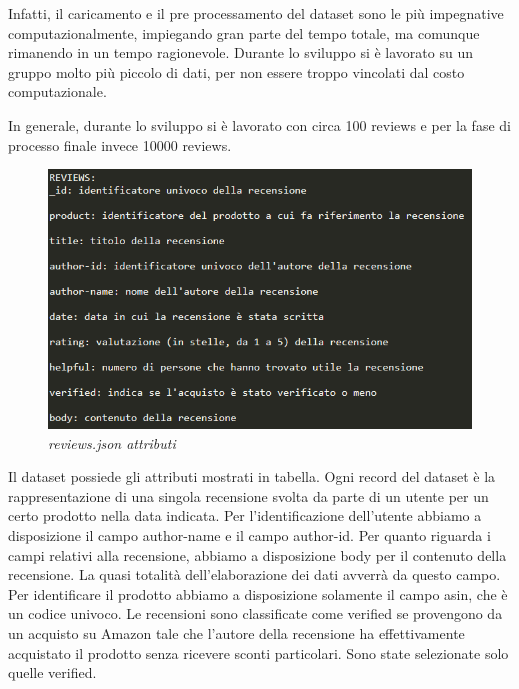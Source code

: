 \documentclass[a4paper,12pt]{article}
\begin{document}
\noindent Infatti, il caricamento e il pre processamento del dataset sono le più impegnative
computazionalmente, impiegando gran parte del tempo totale, ma comunque rimanendo in un tempo ragionevole.
Durante lo sviluppo si è lavorato su un gruppo molto più piccolo di dati, per non essere troppo vincolati dal costo computazionale.

\noindent In generale, durante lo sviluppo si è lavorato con circa 100 reviews e per la fase di processo finale invece 10000 reviews.

\begin{figure}[H]
\centering
\includegraphics[width=0.9\linewidth]{img/reviewsAttributi.png}
\caption{\textit{reviews.json attributi}}
\end{figure}

\noindent Il dataset possiede gli attributi mostrati in tabella. Ogni record del dataset
è la rappresentazione di una singola recensione svolta da parte di un utente per
un certo prodotto nella data indicata.
Per l’identificazione dell’utente abbiamo a disposizione il campo author-name
e il campo author-id.
Per quanto riguarda i campi relativi alla recensione, abbiamo a disposizione body per il contenuto della recensione. La quasi totalità dell'elaborazione dei dati avverrà da questo campo.
Per identificare il prodotto abbiamo a disposizione solamente il campo asin, che
è un codice univoco.
Le recensioni sono classificate come verified se provengono da un acquisto su
Amazon tale che l'autore della recensione ha effettivamente acquistato il prodotto senza ricevere sconti particolari. Sono state selezionate solo quelle verified.
\end{document}

